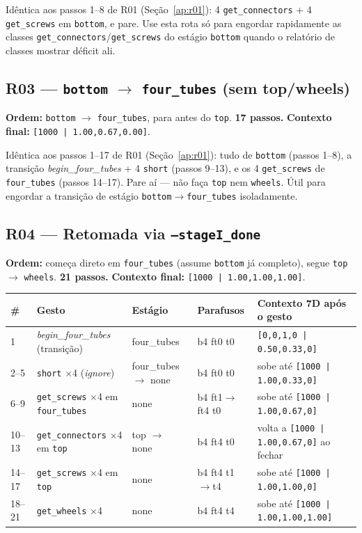 \documentclass[11pt,a4paper]{article}
\begin{document}
Idêntica aos passos 1--8 de R01 (Seção~\ref{ap:r01}): 4
\texttt{get\_connectors} + 4 \texttt{get\_screws} em \texttt{bottom}, e
pare. Use esta rota só para engordar rapidamente as classes
\texttt{get\_connectors}/\texttt{get\_screws} do estágio \texttt{bottom}
quando o relatório de classes mostrar déficit ali.

\subsection{R03 --- \texttt{bottom} $\to$ \texttt{four\_tubes} (sem top/wheels)}
\label{ap:r03}

\textbf{Ordem:} \texttt{bottom} $\to$ \texttt{four\_tubes}, para antes do
\texttt{top}. \textbf{17 passos.} \textbf{Contexto final:}
\texttt{[1000\,|\,1.00,0.67,0.00]}.

Idêntica aos passos 1--17 de R01 (Seção~\ref{ap:r01}): tudo de
\texttt{bottom} (passos 1--8), a transição \textit{begin\_four\_tubes} +
4 \texttt{short} (passos 9--13), e os 4 \texttt{get\_screws} de
\texttt{four\_tubes} (passos 14--17). Pare aí --- não faça \texttt{top} nem
\texttt{wheels}. Útil para engordar a transição de estágio
\texttt{bottom}$\to$\texttt{four\_tubes} isoladamente.

\subsection{R04 --- Retomada via \texttt{--stageI\_done}}
\label{ap:r04}

\textbf{Ordem:} começa direto em \texttt{four\_tubes} (assume
\texttt{bottom} já completo), segue \texttt{top} $\to$ \texttt{wheels}.
\textbf{21 passos.} \textbf{Contexto final:} \texttt{[1000\,|\,1.00,1.00,1.00]}.

\begin{longtable}{p{0.6cm}p{3.1cm}p{2.6cm}p{2.3cm}p{5.5cm}}
\toprule
\textbf{\#} & \textbf{Gesto} & \textbf{Estágio} & \textbf{Parafusos} & \textbf{Contexto 7D após o gesto} \\
\midrule
\endhead
1 & \textit{begin\_four\_tubes} (transição) & four\_tubes & b4 ft0 t0 & \texttt{[0,0,1,0\,|\,0.50,0.33,0]} \\
2--5 & \texttt{short} $\times$4 (\textit{ignore}) & four\_tubes $\to$ none & b4 ft0 t0 & sobe até \texttt{[1000\,|\,1.00,0.33,0]} \\
6--9 & \texttt{get\_screws} $\times$4 em \texttt{four\_tubes} & none & b4 ft1$\to$ft4 t0 & sobe até \texttt{[1000\,|\,1.00,0.67,0]} \\
10--13 & \texttt{get\_connectors} $\times$4 em \texttt{top} & top $\to$ none & b4 ft4 t0 & volta a \texttt{[1000\,|\,1.00,0.67,0]} ao fechar \\
14--17 & \texttt{get\_screws} $\times$4 em \texttt{top} & none & b4 ft4 t1$\to$t4 & sobe até \texttt{[1000\,|\,1.00,1.00,0]} \\
18--21 & \texttt{get\_wheels} $\times$4 & none & b4 ft4 t4 & sobe até \texttt{[1000\,|\,1.00,1.00,1.00]} \\
\bottomrule
\end{longtable}
\end{document}
